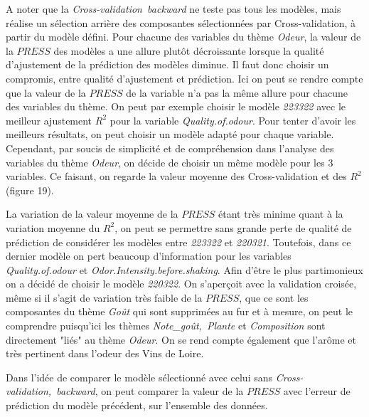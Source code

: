 \documentclass[a4paper,french,10pt]{article}
\begin{document}
A noter que la \textit{Cross-validation~backward} ne teste pas tous les modèles, mais réalise un sélection arrière des composantes sélectionnées par Cross-validation, à partir du modèle défini. \newline
Pour chacune des variables du thème \textit{Odeur}, la valeur de la $PRESS$ des modèles a une allure plutôt décroissante lorsque la qualité d'ajustement de la prédiction des modèles diminue. Il faut donc choisir un compromis, entre qualité d'ajustement et prédiction. \newline
Ici on peut se rendre compte que la valeur de la $PRESS$ de la variable n'a pas la même allure pour chacune des variables du thème. On peut par exemple choisir le modèle \textit{223322} avec le meilleur ajustement $R^2$ pour la variable \textit{Quality.of.odour}.\newline
Pour tenter d'avoir les meilleurs résultats, on peut choisir un modèle adapté pour chaque variable. Cependant, par soucis de simplicité et de compréhension dans l'analyse des variables du thème \textit{Odeur}, on décide de choisir un même modèle pour les 3 variables. Ce faisant, on regarde la valeur moyenne des Cross-validation et des $R^2$ (figure 19).\newline

La variation de la valeur moyenne de la $PRESS$ étant très minime quant à la variation moyenne du $R^2$, on peut se permettre sans grande perte de qualité de prédiction de considérer les modèles entre \textit{223322} et \textit{220321}. Toutefois, dans ce dernier modèle on pert beaucoup d'information pour les variables \textit{Quality.of.odour} et \textit{Odor.Intensity.before.shaking}. Afin d'être le plus partimonieux on a décidé de choisir le modèle \textit{220322}. \newline
On s'aperçoit avec la validation croisée, même si il s'agit de variation très faible de la $PRESS$, que ce sont les composantes du thème \textit{Goût} qui sont supprimées au fur et à mesure, on peut le comprendre puisqu'ici les thèmes \textit{Note\_goût,~Plante} et \textit{Composition} sont directement "liés" au thème \textit{Odeur}. On se rend compte également que l'arôme et très pertinent dans l'odeur des Vins de Loire. \newline

Dans l'idée de comparer le modèle sélectionné avec celui sans \textit{Cross-validation,~backward}, on peut comparer la valeur de la $PRESS$ avec l'erreur de prédiction du modèle précédent, sur l'ensemble des données. \newline
\end{document}
